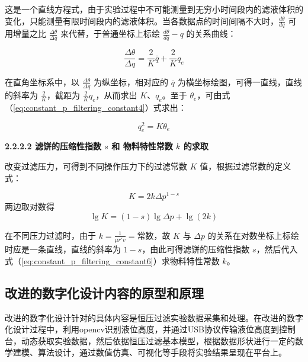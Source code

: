 \documentclass[UTF8,a4paper,fontset=none]{ctexart}
\newcommand{\wuhao}{\fontsize{10.5pt}{15pt}\selectfont}       %
\begin{document}
这是一个直线方程式，由于实验过程中不可能测量到无穷小时间段内的滤液体积的变化，只能测量有限时间段内的滤液体积。当各数据点的时间间隔不大时，$\frac{d \theta}{d q}$ 可用增量之比 $\frac{\Delta \theta}{\Delta q}$ 来代替，于普通坐标上标绘 $\frac{d \theta}{d q} - q$ 的关系曲线：

\begin{equation}
    \frac{\Delta \theta}{\Delta q} = \frac{2}{K} \bar{q} + \frac{2}{K} q_e
    \label{eq:constant_p_filtering_constant3}
\end{equation}

在直角坐标系中，以 $\frac{\Delta \theta}{\Delta q}$ 为纵坐标，相对应的 $\bar{q}$ 为横坐标绘图，可得一直线，直线的斜率为 $\frac{2}{K}$，截距为 $\frac{2}{K} q_e$，从而求出 $K$、$q_e$。至于 $\theta_e$，可由式（\ref{eq:constant_p_filtering_constant4}）式求出：

\begin{equation}
    q_e^2 = K \theta_e
    \label{eq:constant_p_filtering_constant4}
\end{equation}

{\noindent \wuhao \rmfamily {} \textbf{2.2.2.2 \quad 滤饼的压缩性指数 $s$ 和 物料特性常数 $k$ 的求取}}

改变过滤压力，可得到不同操作压力下的过滤常数 $K$ 值，根据过滤常数的定义式：

\begin{equation}
    K = 2k \Delta p^{1-s}
    \label{eq:constant_p_filtering_constant5}
\end{equation}
两边取对数得
\begin{equation}
    \lg K = (1-s)\lg \Delta p + \lg (2k)
    \label{eq:constant_p_filtering_constant6}
\end{equation}

在不同压力过滤时，由于 $k = \frac{1}{\mu r' v} = \text{常数}$，故 $K$ 与 $\Delta p$ 的关系在对数坐标上标绘时应是一条直线，直线的斜率为 $1-s$，由此可得滤饼的压缩性指数 $s$，然后代入式（\ref{eq:constant_p_filtering_constant6}）求物料特性常数 $k$。

\subsection{改进的数字化设计内容的原型和原理}


改进的数字化设计针对的具体内容是恒压过滤实验数据采集和处理。在改进的数字化设计过程中，利用opencv识别液位高度，并通过USB协议传输液位高度到控制台，动态获取实验数据，然后依据恒压过滤基本模型，根据数据形状进行一定的数学建模、算法设计，通过数值仿真、可视化等手段将实验结果呈现在平台上。
\end{document}

